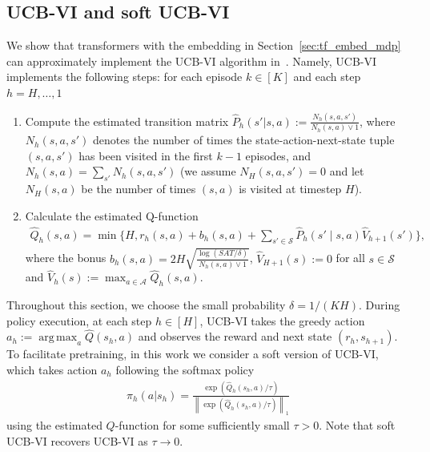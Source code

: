\documentclass[10pt]{article}
\DeclareMathOperator*{\argmax}{arg\,max}
\newcommand{\norm}[1]{\left\|{#1}\right\|}
\newcommand{\lone}[1]{\norm{#1}_1}
\newcommand{\<}{\left\langle}
\renewcommand{\>}{\right\rangle}
\newcommand{\temp}{{\tau}}
\newcommand{\state}{{s}}
\newcommand{\action}{{a}}
\newcommand{\reward}{{r}}
\newcommand{\totlen}{{T}}
\newcommand{\plc}{{\pi}}
\newcommand{\Numepi}{{K}}
\newcommand{\horizon}{{H}}
\newcommand{\statesp}{{\mathcal{S}}}
\newcommand{\actionsp}{{\mathcal{A}}}
\renewcommand{\horizon}{{H}}
\newcommand{\bonus}{{b}}
\newcommand{\tresttransit}{\widehat{P}}
\newcommand{\valuefun}{{V}}
\newcommand{\Numst}{{S}}
\newcommand{\Numact}{{A}}
\newcommand{\Numvi}{{N}}
\newcommand{\Qfun}{{Q}}
\newcommand{\trestQfun}{{\widehat{\Qfun}}}
\newcommand{\Vfun}{{\valuefun}}
\newcommand{\trestVfun}{{\widehat{\Vfun}}}
\begin{document}
\subsection{UCB-VI and soft UCB-VI}\label{sec:example_ucbvi}
We show that transformers with the embedding in Section~\ref{sec:tf_embed_mdp}  can approximately implement the  UCB-VI algorithm in~\cite{azar2017minimax}. Namely, UCB-VI implements the following steps:
for each episode $k\in[\Numepi]$ and each step $h=\horizon,\ldots,1$
\begin{enumerate}
    \item Compute the estimated transition matrix $\tresttransit_h(\state'|\state,\action):=   \frac{\Numvi_h(\state,\action,\state')}{\Numvi_h(\state,\action)\vee 1}$,  where $\Numvi_h(\state,\action,\state')$ denotes the number of times the state-action-next-state tuple $(\state,\action,\state')$ has been visited in the first $k-1$ episodes, and $\Numvi_h(\state,\action)=\sum_{\state'}\Numvi_h(\state,\action,\state')$ (we assume $\Numvi_\horizon(\state,\action,\state')=0$ and let $\Numvi_\horizon(\state,\action)$  be the number of times $(\state,\action)$ is visited at timestep $\horizon$).
    \item Calculate the estimated Q-function \begin{align*}
\trestQfun_h(\state,\action)=\min\{\horizon,\reward_h(\state,\action)+\bonus_h(\state,\action)+\sum_{\state'\in\statesp}\tresttransit_h(\state'\mid\state,\action)\trestVfun_{h+1}(\state')\},\end{align*}
where the bonus $\bonus_h(\state,\action)=2\horizon\sqrt{\frac{\log(\Numst\Numact\totlen/\delta)}{\Numvi_h(\state,\action)\vee1}}$,  $\trestVfun_{\horizon+1}(\state):=0$ for all $\state\in\statesp$ and $\trestVfun_h(\state):=\max_{\action\in\actionsp}\trestQfun_h(\state,\action)$.
\end{enumerate} Throughout this section, we choose the small probability $\delta=1/(\Numepi\horizon)$.
During policy execution, at each step $h\in[\horizon]$, UCB-VI takes the greedy action $\action_h:=\argmax_{\action}\trestQfun(\state_h,\action)$ and observes the reward and next state $(\reward_h,\state_{h+1})$. To facilitate pretraining, in this work we consider a soft version of UCB-VI, which takes action $\action_h$  following the softmax policy
\begin{align*}
\plc_h(\action|\state_h)=\frac{\exp(\trestQfun_h(\state_h,\action)/\temp)}{\lone{\exp(\trestQfun_h(\state_h,\action)/\temp)}}
\end{align*}
using the estimated $Q$-function for some sufficiently small $\temp>0$. Note that soft UCB-VI recovers UCB-VI as $\temp\to 0$.
\end{document}
